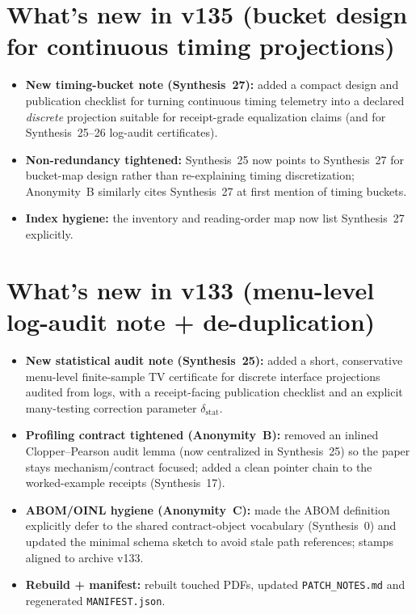 \documentclass[11pt]{article}
\begin{document}
\section{What's new in v135 (bucket design for continuous timing projections)}

\begin{itemize}[leftmargin=*]
\item \textbf{New timing-bucket note (Synthesis~27):} added a compact design and publication checklist for turning continuous timing telemetry into a declared \emph{discrete} projection suitable for receipt-grade equalization claims (and for Synthesis~25--26 log-audit certificates).
\item \textbf{Non-redundancy tightened:} Synthesis~25 now points to Synthesis~27 for bucket-map design rather than re-explaining timing discretization; Anonymity~B similarly cites Synthesis~27 at first mention of timing buckets.
\item \textbf{Index hygiene:} the inventory and reading-order map now list Synthesis~27 explicitly.
\end{itemize}


\section{What's new in v133 (menu-level log-audit note + de-duplication)}
\begin{itemize}[leftmargin=*]
\item \textbf{New statistical audit note (Synthesis~25):} added a short, conservative menu-level finite-sample TV certificate for discrete interface projections audited from logs, with a receipt-facing publication checklist and an explicit many-testing correction parameter $\delta_{\mathrm{stat}}$.
\item \textbf{Profiling contract tightened (Anonymity~B):} removed an inlined Clopper--Pearson audit lemma (now centralized in Synthesis~25) so the paper stays mechanism/contract focused; added a clean pointer chain to the worked-example receipts (Synthesis~17).
\item \textbf{ABOM/OINL hygiene (Anonymity~C):} made the ABOM definition explicitly defer to the shared contract-object vocabulary (Synthesis~0) and updated the minimal schema sketch to avoid stale path references; stamps aligned to archive v133.
\item \textbf{Rebuild + manifest:} rebuilt touched PDFs, updated \texttt{PATCH\_NOTES.md} and regenerated \texttt{MANIFEST.json}.
\end{itemize}
\end{document}
